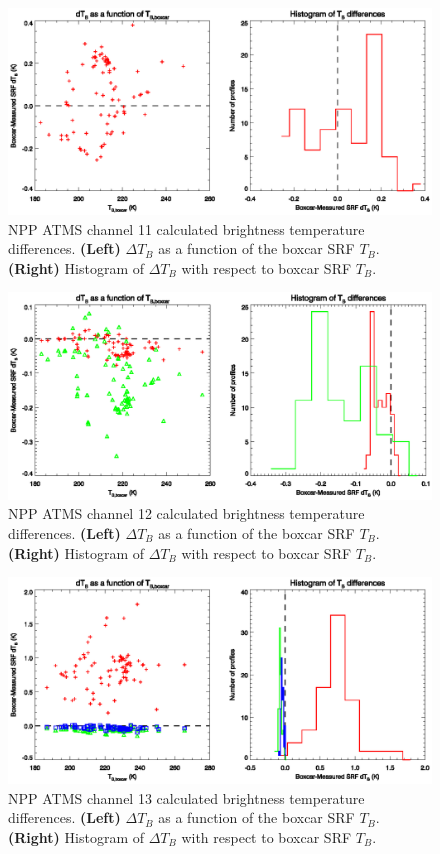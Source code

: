 \begin{figure}[H]
  \centering
  \includegraphics[scale=1]{graphics/dtb/atms_npp.ch11.TbStats.eps}
  \caption{NPP ATMS channel 11 calculated brightness temperature differences. \textbf{(Left)} $\Delta T_B$ as a function of the boxcar SRF $T_B$. \textbf{(Right)} Histogram of $\Delta T_B$ with respect to boxcar SRF $T_B$.}
  \label{fig:atms_npp.ch11.dtb}
\end{figure}

\begin{figure}[H]
  \centering
  \includegraphics[scale=1]{graphics/dtb/atms_npp.ch12.TbStats.eps}
  \caption{NPP ATMS channel 12 calculated brightness temperature differences. \textbf{(Left)} $\Delta T_B$ as a function of the boxcar SRF $T_B$. \textbf{(Right)} Histogram of $\Delta T_B$ with respect to boxcar SRF $T_B$.}
  \label{fig:atms_npp.ch12.dtb}
\end{figure}

\begin{figure}[H]
  \centering
  \includegraphics[scale=1]{graphics/dtb/atms_npp.ch13.TbStats.eps}
  \caption{NPP ATMS channel 13 calculated brightness temperature differences. \textbf{(Left)} $\Delta T_B$ as a function of the boxcar SRF $T_B$. \textbf{(Right)} Histogram of $\Delta T_B$ with respect to boxcar SRF $T_B$.}
  \label{fig:atms_npp.ch13.dtb}
\end{figure}

